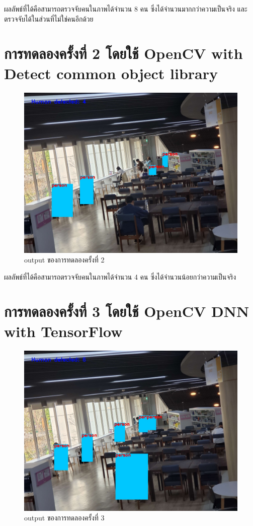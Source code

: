 ผลลัพธ์ที่ได้คือสามารถตรวจจับคนในภาพได้จำนวน 8 คน ซึ่งได้จำนวนมากกว่าความเป็นจริง และตรวจจับได้ในส่วนที่ไม่ใช่คนอีกด้วย

\section{การทดลองครั้งที่ 2 โดยใช้ OpenCV with Detect common object library}
\begin{figure}[ht]
\centering
\includegraphics[scale=0.25]{images/cvlib_output.jpg}
\caption[output2]{output ของการทดลองครั้งที่ 2}
\label{fig:output2}
\end{figure}

ผลลัพธ์ที่ได้คือสามารถตรวจจับคนในภาพได้จำนวน 4 คน ซึ่งได้จำนวนน้อยกว่าความเป็นจริง
\newpage
\section{การทดลองครั้งที่ 3 โดยใช้ OpenCV DNN with TensorFlow}
\begin{figure}[ht]
\centering
\includegraphics[scale=0.25]{images/dnn_output.jpg}
\caption[output3]{output ของการทดลองครั้งที่ 3}
\label{fig:output3}
\end{figure}

